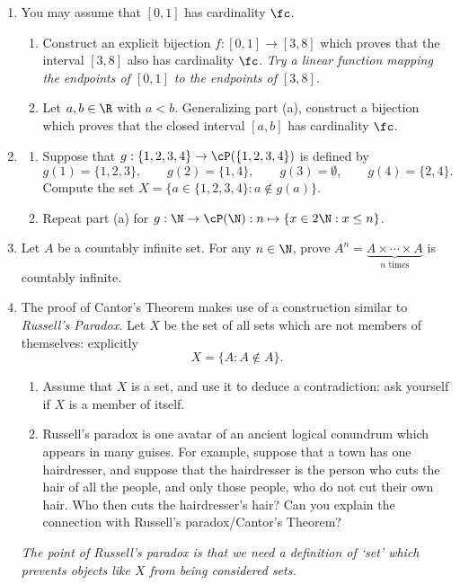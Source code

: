 \begin{enumerate}\renewcommand{\labelenumi}{\thesubsection.\theenumi}
  \item You may assume that $[0,1]$ has cardinality $\fc$.
  \begin{enumerate}
    \item Construct an explicit bijection $f:[0,1]\to [3,8]$ which proves that the interval $[3,8]$ also has cardinality $\fc$. \emph{Try a linear function mapping the endpoints of $[0,1]$ to the endpoints of $[3,8]$.}
    \item Let $a,b\in\R$ with $a<b$. Generalizing part (a), construct a bijection which proves that the closed interval $[a,b]$ has cardinality $\fc$.
  \end{enumerate}
  
  \item\begin{enumerate}
    \item Suppose that $g:\{1,2,3,4\}\to\cP(\{1,2,3,4\})$ is defined by
  	\[g(1)=\{1,2,3\},\qquad g(2)=\{1,4\},\qquad g(3)=\emptyset,\qquad g(4)=\{2,4\}.\]
  	Compute the set $X=\bigl\{a\in\{1,2,3,4\}:a\not\in g(a)\bigr\}$.
  	\item Repeat part (a) for $g:\N\to\cP(\N):n\mapsto\{x\in 2\N:x\le n\}$.
  \end{enumerate}
  
  \item Let $A$ be a countably infinite set. For any $n \in \N$, prove $A^n = \underbrace{A \times \cdots \times A}_{n \text{ times}}$ is countably infinite.

  
   \item The proof of Cantor's Theorem makes use of a construction similar to \emph{Russell's Paradox.} Let $X$ be the set of all sets which are not members of themselves: explicitly
  	\[X=\{A:A\not\in A\}.\]
  	\begin{enumerate}
    	\item Assume that $X$ is a set, and use it to deduce a contradiction: ask yourself if $X$ is a member of itself.
    	\item Russell's paradox is one avatar of an ancient logical conundrum which appears in many guises. For example, suppose that a town has one hairdresser, and suppose that the hairdresser is the person who cuts the hair of all the people, and only those people, who do not cut their own hair. Who then cuts the hairdresser's hair? Can you explain the connection with Russell's paradox/Cantor's Theorem?
  	\end{enumerate}
  	\emph{The point of Russell's paradox is that we need a definition of `set' which prevents objects like $X$ from being considered sets.}
  	

\end{enumerate}
